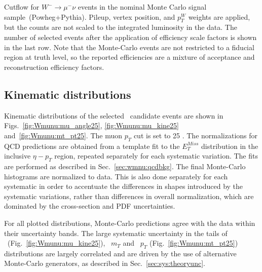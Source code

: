 \begin{table}
\begin{center}

\caption{ Cutflow for $W^{-} \rightarrow \mu^{-} \nu$ events in the nominal Monte Carlo signal sample~(Powheg+Pythia). Pileup, vertex position, and $p_T^{W}$  weights are applied, but the counts are not scaled to the integrated luminosity in the data. The number of selected events after the application of efficiency scale factors is shown in the last row. Note that the Monte-Carlo events are not restricted to a fiducial region at truth level, so the reported efficiencies are a mixture of acceptance and reconstruction efficiency factors.}
\label{tab:Wmunu:cutflow_mc_NEG_pt25}
\end{center}
\end{table}

\subsection{Kinematic distributions}
Kinematic distributions of the selected \Wmn\ candidate events are shown in Figs.~\ref{fig:Wmunu:mu_angle25}, \ref{fig:Wmunu:mu_kine25} and~\ref{fig:Wmunu:mt_pt25}. The muon $p_{T}$ cut is set to 25 \GeV. The normalizations for QCD predictions are obtained from a template fit to the $E_T^{Miss}$ distribution in the inclusive $\eta - p_{T}$ region, repeated separately for each systematic variation. The fits are performed as described in Sec.~\ref{sec:wmnu:qcdbkg}. The final Monte-Carlo histograms are normalized to data. This is also done separately for each systematic in order to accentuate the differences in shapes introduced by the systematic variations, rather than differences in overall normalization, which are dominated by the cross-section and PDF uncertainties.

For all plotted distributions, Monte-Carlo predictions agree with the data within their uncertainty bands. The large systematic uncertainty in the tails of \MET\ (Fig.~\ref{fig:Wmunu:mu_kine25}), \Wboson\ $m_T$ and \Wboson\ $p_T$ (Fig.~\ref{fig:Wmunu:mt_pt25}) distributions are largely correlated and are driven by the use of alternative Monte-Carlo generators, as described in Sec.~\ref{sec:sys:theoryunc}.



